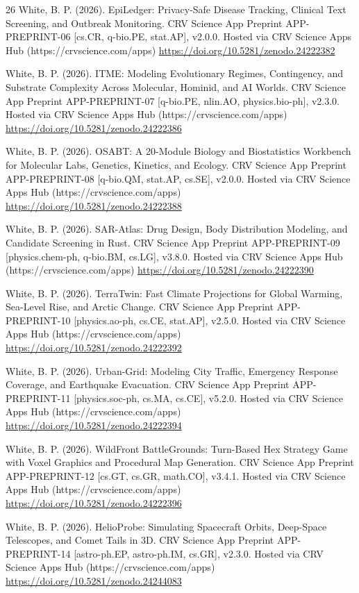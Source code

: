 \documentclass[10pt,letterpaper]{article}
\begin{document}
\begin{thebibliography}{26}
 White, B. P. (2026). EpiLedger: Privacy-Safe Disease Tracking, Clinical Text Screening, and Outbreak Monitoring. CRV Science App Preprint APP-PREPRINT-06 [cs.CR, q-bio.PE, stat.AP], v2.0.0. Hosted via CRV Science Apps Hub (https://crvscience.com/apps) \url{https://doi.org/10.5281/zenodo.24222382}

 White, B. P. (2026). ITME: Modeling Evolutionary Regimes, Contingency, and Substrate Complexity Across Molecular, Hominid, and AI Worlds. CRV Science App Preprint APP-PREPRINT-07 [q-bio.PE, nlin.AO, physics.bio-ph], v2.3.0. Hosted via CRV Science Apps Hub (https://crvscience.com/apps) \url{https://doi.org/10.5281/zenodo.24222386}

 White, B. P. (2026). OSABT: A 20-Module Biology and Biostatistics Workbench for Molecular Labs, Genetics, Kinetics, and Ecology. CRV Science App Preprint APP-PREPRINT-08 [q-bio.QM, stat.AP, cs.SE], v2.0.0. Hosted via CRV Science Apps Hub (https://crvscience.com/apps) \url{https://doi.org/10.5281/zenodo.24222388}

 White, B. P. (2026). SAR-Atlas: Drug Design, Body Distribution Modeling, and Candidate Screening in Rust. CRV Science App Preprint APP-PREPRINT-09 [physics.chem-ph, q-bio.BM, cs.LG], v3.8.0. Hosted via CRV Science Apps Hub (https://crvscience.com/apps) \url{https://doi.org/10.5281/zenodo.24222390}

 White, B. P. (2026). TerraTwin: Fast Climate Projections for Global Warming, Sea-Level Rise, and Arctic Change. CRV Science App Preprint APP-PREPRINT-10 [physics.ao-ph, cs.CE, stat.AP], v2.5.0. Hosted via CRV Science Apps Hub (https://crvscience.com/apps) \url{https://doi.org/10.5281/zenodo.24222392}

 White, B. P. (2026). Urban-Grid: Modeling City Traffic, Emergency Response Coverage, and Earthquake Evacuation. CRV Science App Preprint APP-PREPRINT-11 [physics.soc-ph, cs.MA, cs.CE], v5.2.0. Hosted via CRV Science Apps Hub (https://crvscience.com/apps) \url{https://doi.org/10.5281/zenodo.24222394}

 White, B. P. (2026). WildFront BattleGrounds: Turn-Based Hex Strategy Game with Voxel Graphics and Procedural Map Generation. CRV Science App Preprint APP-PREPRINT-12 [cs.GT, cs.GR, math.CO], v3.4.1. Hosted via CRV Science Apps Hub (https://crvscience.com/apps) \url{https://doi.org/10.5281/zenodo.24222396}

 White, B. P. (2026). HelioProbe: Simulating Spacecraft Orbits, Deep-Space Telescopes, and Comet Tails in 3D. CRV Science App Preprint APP-PREPRINT-14 [astro-ph.EP, astro-ph.IM, cs.GR], v2.3.0. Hosted via CRV Science Apps Hub (https://crvscience.com/apps) \url{https://doi.org/10.5281/zenodo.24244083}


\end{thebibliography}
\end{document}
